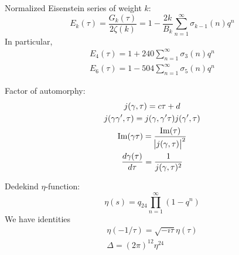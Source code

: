 \documentclass[11pt]{article}
\renewcommand{\Im}{\operatorname{Im}}
\begin{document}
\noindent Normalized Eisenstein series of weight $k$:
\begin{equation*}
    E_k(\tau) = \frac{G_k(\tau)}{2 \zeta(k)} = 1 - \frac{2k}{B_k} \sum_{n=1}^{\infty} \sigma_{k-1}(n)q^n
\end{equation*}
In particular,
\begin{gather*}
    E_4(\tau) = 1 + 240 \sum_{n=1}^{\infty} \sigma_3(n) q^n\\
    E_6(\tau) = 1 - 504 \sum_{n=1}^{\infty} \sigma_5(n) q^n
\end{gather*}

\noindent Factor of automorphy:
\begin{gather*}
    j(\gamma, \tau) = c \tau + d\\
    j(\gamma \gamma', \tau) = j(\gamma, \gamma' \tau) j(\gamma', \tau)\\
    \Im(\gamma\tau) = \frac{\Im(\tau)}{\abs{j(\gamma, \tau)}^2}\\
    \frac{d \gamma (\tau)}{d \tau} = \frac{1}{j(\gamma, \tau)^2}
\end{gather*}

\noindent Dedekind $\eta$-function:
\begin{equation*}
    \eta(s) = q_{24} \prod_{n=1}^{\infty} (1 - q^n)
\end{equation*}
We have identities
\begin{gather*}
    \eta(-1/\tau) = \sqrt{- i \tau} \eta(\tau)\\
    \Delta = (2 \pi)^12 \eta^{24}
\end{gather*}
\end{document}
